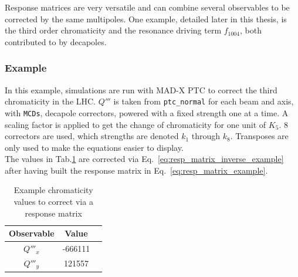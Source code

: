 Response matrices are very versatile and can combine several observables to be corrected by the same
multipoles. One example, detailed later in this thesis, is the third order chromaticity and the
resonance driving term $f_{1004}$, both contributed to by decapoles.

\subsubsection{Example}

In this example, simulations are run with MAD-X PTC to correct the third chromaticity in the LHC.
$Q'''$ is taken from \verb|ptc_normal| for each beam and axis, with \verb|MCDs|, decapole
correctors, powered with a fixed strength one at a time. A scaling factor is applied to get the
change of chromaticity for one unit of $K_5$.  8 correctors are used, which strengths are denoted
$k_1$ through $k_8$.  Transposes are only used to make the equations easier to display.\\
The values in Tab.\ref{table:resp_matrix_example} are corrected via
Eq.~\eqref{eq:resp_matrix_inverse_example} after having built the response matrix in
Eq.~\eqref{eq:resp_matrix_example}.

\begin{table}[H]
  \center
  \begin{tabular}{c c c}
      Observable & Value \\
      \hline
      $Q'''_x$ & -666111 \\
      $Q'''_y$ &  121557 \\
  \end{tabular}
  \caption{Example chromaticity values to correct via a response matrix}
  \label{table:resp_matrix_example}
\end{table}

